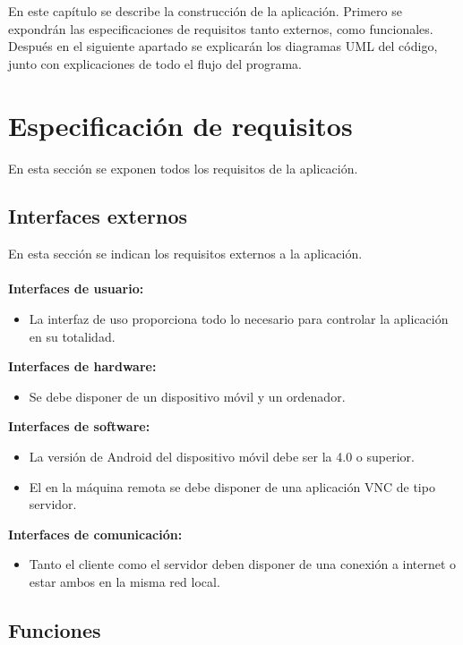 En este capítulo se describe la construcción de la aplicación. Primero se expondrán las especificaciones de requisitos tanto externos, como funcionales. Después en el siguiente apartado se explicarán los diagramas UML del código, junto con explicaciones de todo el flujo del programa.\\

\section {Especificaci\'on de requisitos}

En esta sección se exponen todos los requisitos de la aplicación.\\

\subsection {Interfaces externos}

En esta sección se indican los requisitos externos a la aplicación.\\ \\
\textbf{Interfaces de usuario:}
\begin{itemize}
\item La interfaz de uso proporciona todo lo necesario para controlar la aplicación en su totalidad.\\
\end{itemize}
\textbf{Interfaces de hardware:}
\begin{itemize}
\item Se debe disponer de un dispositivo móvil y un ordenador.\\
\end{itemize}
\textbf{Interfaces de software:}
\begin{itemize}
\item La versión de Android del dispositivo móvil debe ser la 4.0 o superior.
\item El en la máquina remota se debe disponer de una aplicación VNC de tipo servidor.\\
\end{itemize}
\textbf{Interfaces de comunicación:}
\begin{itemize}
\item Tanto el cliente como el servidor deben disponer de una conexión a internet o estar ambos en la misma red local.\\
\end{itemize}
\subsection {Funciones}


